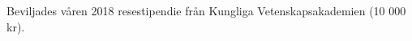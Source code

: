 

\begin{cvparagraph}

Beviljades v{\aa}ren 2018 resestipendie fr{\aa}n Kungliga Vetenskapsakademien (10 000 kr).
\end{cvparagraph}